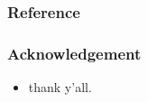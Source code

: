 \documentclass{../../../Cls/SDU/Beamer/Beamer}
\begin{document}
\begin{frame}
    \frametitle{Reference} %
    \printbibliography %
\end{frame}

\begin{frame}
    \frametitle{Acknowledgement} %
    \begin{itemize}
        \item thank y'all. %
    \end{itemize}
\end{frame}

\end{document}
